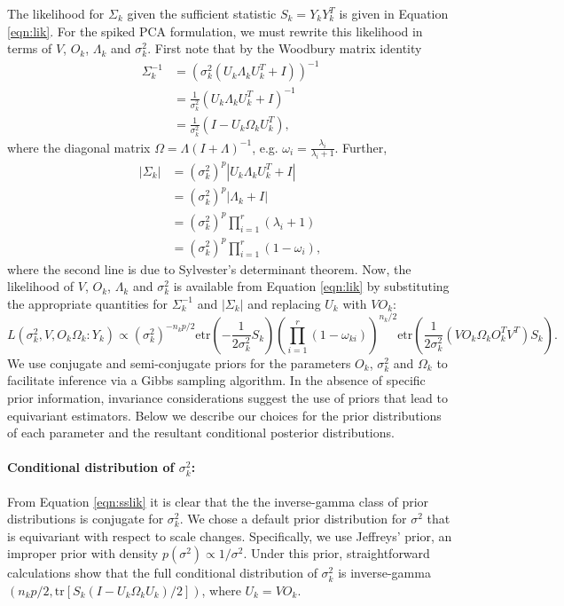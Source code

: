 \documentclass[12pt]{article}
\newcommand{\tr}{\text{tr}}
\newcommand{\etr}{\text{etr}}
\begin{document}
The likelihood for $\Sigma_k$ given the sufficient statistic
$S_k = Y_kY_k^T$ is given in Equation \ref{eqn:lik}.  For the
spiked PCA formulation, we must rewrite this likelihood in terms of $V$, $O_k$,
$\Lambda_k$ and $\sigma_k^2$.  First note that by the Woodbury matrix
identity
\begin{align}
\nonumber \Sigma^{-1}_k &=  (\sigma_k^2(U_k\Lambda_kU_k^T+I))^{-1}\\
\nonumber &= \frac{1}{\sigma_k^2}(U_k\Lambda_kU_k^T+I)^{-1}\\
&= \frac{1}{\sigma_k^2}(I-U_k\Omega_kU_k^T),
\end{align}
%
\noindent where the diagonal matrix $\Omega = \Lambda(I+\Lambda)^{-1}$, e.g. $\omega_i = \frac{\lambda_i}{\lambda_{i}+1}$.  Further, 
%
\begin{align}
\nonumber |\Sigma_k| &= (\sigma_k^2)^{p}|U_k\Lambda_kU_k^T+I|\\
\nonumber &= (\sigma_k^2)^{p}|\Lambda_k+I| \\
\nonumber &= (\sigma_k^2)^{p}\prod_{i=1}^r(\lambda_i+1)\\
&= (\sigma_k^2)^{p}\prod_{i=1}^r(1-\omega_i),
\end{align}
%
\noindent where the second line is due to Sylvester's determinant
theorem.  Now, the likelihood of $V$, $O_k$, $\Lambda_k$ and
$\sigma_k^2$ is available from Equation \ref{eqn:lik} by substituting
the appropriate quantities for $\Sigma^{-1}_k$ and $|\Sigma_k|$ and
replacing $U_k$ with $VO_k$:
%
\begin{equation}
 L(\sigma_k^2, V , O_k \Omega_k : Y_k) \propto
    (\sigma_k^2)^{-n_kp/2}\etr(-\frac{1}{2\sigma_k^2}S_k)\left(\prod_{i=1}^r(1-\omega_{ki})
   \right) ^{n_k/2}
   \etr(\frac{1}{2\sigma_k^2}(VO_k\Omega_kO_k^TV^T)S_k).
\label{eqn:sslik}
\end{equation}
%
\noindent We use conjugate and semi-conjugate priors for the parameters $O_k$,
$\sigma^2_k$ and $\Omega_k$ to facilitate inference via a Gibbs
sampling algorithm.  In the absence of specific prior information,
invariance considerations suggest the use of priors that lead to
equivariant estimators.  Below we describe our choices for the prior
distributions of each parameter and the resultant conditional posterior
distributions.

\paragraph{Conditional distribution of $\sigma_k^2$:}

From Equation \ref{eqn:sslik} it is clear that the the inverse-gamma
class of prior distributions is conjugate for $\sigma_k^2$.  We chose a
default prior distribution for $\sigma^2$ that is equivariant with
respect to scale changes.  Specifically, we use Jeffreys' prior, an
improper prior with density $p(\sigma^2) \propto 1/\sigma^2 $.  Under
this prior, straightforward calculations show that the full
conditional distribution of $\sigma_k^2$ is
inverse-gamma$( n_k p/2 , \tr[S_k( I - U_k\Omega_k
U_k)/2])$, where $U_k = VO_k$.
\end{document}
